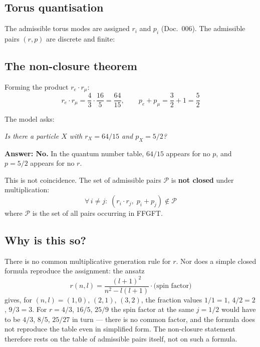 \subsection{Torus quantisation}

The admissible torus modes are assigned $r_i$ and $p_i$ (Doc.~006). The admissible pairs $(r,p)$ are discrete and finite:

\begin{center}
{\footnotesize
{}
}
\end{center}

\subsection{The non-closure theorem}

Forming the product $r_e \cdot r_\mu$:
\[
  r_e \cdot r_\mu = \frac{4}{3} \cdot \frac{16}{5} = \frac{64}{15},
  \qquad p_e + p_\mu = \frac{3}{2} + 1 = \frac{5}{2}
\]

The model asks:
\begin{center}
  \emph{Is there a particle $X$ with $r_X = 64/15$ and $p_X = 5/2$?}
\end{center}

\textbf{Answer: No.} In the quantum number table, $64/15$ appears for
no $p$, and $p=5/2$ appears for no $r$.

This is not coincidence. The set of admissible pairs $\mathcal{P}$
is \textbf{not closed} under multiplication:
\[
  \forall\, i \neq j:\; (r_i \cdot r_j,\; p_i + p_j) \notin \mathcal{P}
\]
where $\mathcal{P}$ is the set of all pairs occurring in FFGFT.

\subsection{Why is this so?}

There is no common multiplicative generation rule for $r$.
Nor does a simple closed formula reproduce the assignment: the ansatz
\[
  r(n,l) = \frac{(l+1)^2}{n^2 - l(l+1)} \cdot \text{(spin factor)}
\]
gives, for $(n,l) = (1,0)$, $(2,1)$, $(3,2)$, the fraction values
$1/1 = 1$, $4/2 = 2$, $9/3 = 3$. For $r = 4/3$, $16/5$, $25/9$ the spin
factor at the same $j = 1/2$ would have to be $4/3$, $8/5$, $25/27$ in
turn --- there is no common factor, and the formula does not reproduce the
table even in simplified form. The non-closure statement therefore rests
on the table of admissible pairs itself, not on such a formula.

